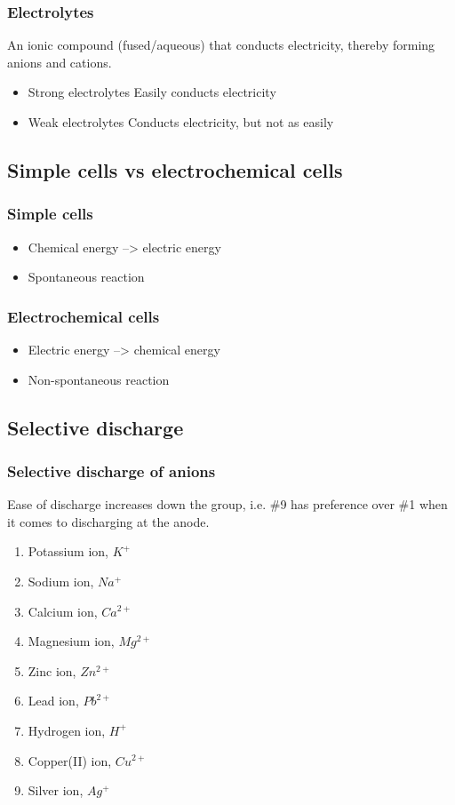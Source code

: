 \documentclass[11pt]{article}
\begin{document}
\subsubsection{Electrolytes}
\label{sec:orge66f7dc}
An ionic compound (fused/aqueous) that conducts electricity, thereby forming anions and cations.
\begin{itemize}
\item Strong electrolytes
Easily conducts electricity
\item Weak electrolytes
Conducts electricity, but not as easily
\end{itemize}
\subsection{Simple cells vs electrochemical cells}
\label{sec:orgea43e21}
\subsubsection{Simple cells}
\label{sec:org3932770}
\begin{itemize}
\item Chemical energy --> electric energy
\item Spontaneous reaction
\end{itemize}
\subsubsection{Electrochemical cells}
\label{sec:org02857be}
\begin{itemize}
\item Electric energy --> chemical energy
\item Non-spontaneous reaction
\end{itemize}
\subsection{Selective discharge}
\label{sec:org86f2e3a}
\subsubsection{Selective discharge of anions}
\label{sec:org5d46af3}
Ease of discharge increases down the group, i.e. \#9 has preference over \#1 when it comes to discharging at the anode.
\begin{enumerate}
\item Potassium ion, \(K^+\)
\item Sodium ion, \(Na^+\)
\item Calcium ion, \(Ca^{2+}\)
\item Magnesium ion, \(Mg^{2+}\)
\item Zinc ion, \(Zn^{2+}\)
\item Lead ion, \(Pb^{2+}\)
\item Hydrogen ion, \(H^+\)
\item Copper(II) ion, \(Cu^{2+}\)
\item Silver ion, \(Ag^+\)
\end{enumerate}
\end{document}
